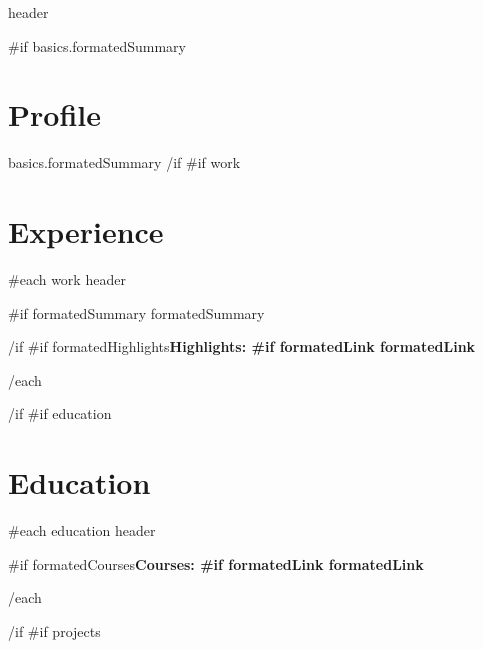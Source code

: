 \documentclass{article}
\begin{document}
\begin{paracol}{2}
\begin{rightcolumn}
\titleformat{\section}{\color{accent}\raggedright\normalsize\bfseries\uppercase}{}{0ex}{}[{\titlerule[0.8pt]}]
\titlespacing{\section}{0ex}{0.5ex}{0.75ex}

{{ header }}

{{#if basics.formatedSummary}}
\section*{Profile} {
  {{ basics.formatedSummary }}
}
{{/if}}
{{#if work}}
\section*{Experience} {
  {{#each work}}
    {{ header }}\par
    {{#if formatedSummary}}
      {{ formatedSummary }}
      \par
    {{/if}}
    {{#if formatedHighlights}}\bfseries Highlights: 
    {{#if formatedLink}}{{ formatedLink }}
    \par
  {{/each}}
}
{{/if}}
{{#if education}}
\section*{Education} {
  {{#each education}}
    {{ header }}\par
    {{#if formatedCourses}}\bfseries Courses: 
    {{#if formatedLink}}{{ formatedLink }}
    \par
  {{/each}}
}
{{/if}}
{{#if projects}}

\end{rightcolumn}
\end{paracol}
\end{document}
